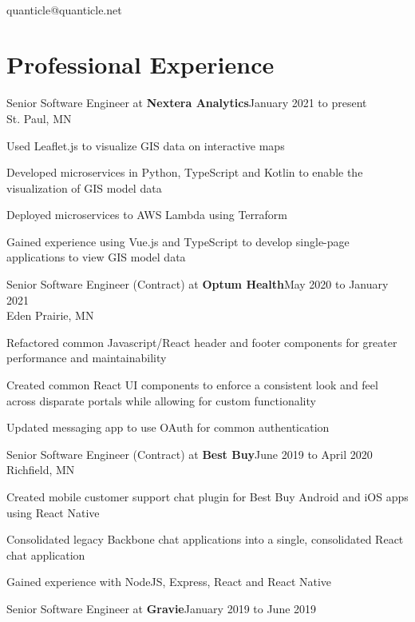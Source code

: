 \documentclass[letterpaper]{article}
\newenvironment{resume-list}
{\begin{itemize}
 \setlength{\itemsep}{0pt}
 \setlength{\parskip}{0pt}}
{\end{itemize}}
\begin{document}
\\
{\small quanticle@quanticle.net}\\
\section*{Professional Experience}
\noindent Senior Software Engineer at {\bfseries Nextera Analytics}\dotfill January 2021 to present\\
St. Paul, MN
\begin{resume-list}
\item Used Leaflet.js to visualize GIS data on interactive maps
\item Developed microservices in Python, TypeScript and Kotlin to enable the visualization of GIS model data
\item Deployed microservices to AWS Lambda using Terraform
\item Gained experience using Vue.js and TypeScript to develop single-page applications to view GIS model data
\end{resume-list}
\noindent Senior Software Engineer (Contract) at {\bfseries Optum Health}\dotfill May 2020 to January 2021\\
Eden Prairie, MN
\begin{resume-list}
\item Refactored common Javascript/React header and footer components for greater performance and maintainability
\item Created common React UI components to enforce a consistent look and feel across disparate portals while allowing for custom functionality
\item Updated messaging app to use OAuth for common authentication
\end{resume-list}
\noindent Senior Software Engineer (Contract) at {\bfseries Best Buy}\dotfill June 2019 to April 2020\\
Richfield, MN
\begin{resume-list}
\item Created mobile customer support chat plugin for Best Buy Android and iOS apps using React Native
\item Consolidated legacy Backbone chat applications into a single, consolidated React chat application
\item Gained experience with NodeJS, Express, React and React Native
\end{resume-list}
\noindent Senior Software Engineer at {\bfseries Gravie}\dotfill January 2019 to June 2019\\
\end{document}

